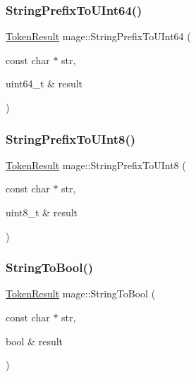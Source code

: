 \hypertarget{namespacemage_ae0ffd357b75c2e9321dcf44c00f1b607}{}\label{namespacemage_ae0ffd357b75c2e9321dcf44c00f1b607} 
\subsubsection{\texorpdfstring{String\+Prefix\+To\+U\+Int64()}{StringPrefixToUInt64()}}
{\footnotesize\ttfamily \hyperlink{namespacemage_a2178ba2411db5912f41b2e7698c2037d}{Token\+Result} mage\+::\+String\+Prefix\+To\+U\+Int64 (\begin{DoxyParamCaption}\item[{const char $\ast$}]{str,  }\item[{uint64\+\_\+t \&}]{result }\end{DoxyParamCaption})}

\hypertarget{namespacemage_ace3c30c1b0e1eddafc8f14335223c46b}{}\label{namespacemage_ace3c30c1b0e1eddafc8f14335223c46b} 
\subsubsection{\texorpdfstring{String\+Prefix\+To\+U\+Int8()}{StringPrefixToUInt8()}}
{\footnotesize\ttfamily \hyperlink{namespacemage_a2178ba2411db5912f41b2e7698c2037d}{Token\+Result} mage\+::\+String\+Prefix\+To\+U\+Int8 (\begin{DoxyParamCaption}\item[{const char $\ast$}]{str,  }\item[{uint8\+\_\+t \&}]{result }\end{DoxyParamCaption})}

\hypertarget{namespacemage_a4936774f925ba96c5b8d37c5e54cca02}{}\label{namespacemage_a4936774f925ba96c5b8d37c5e54cca02} 
\subsubsection{\texorpdfstring{String\+To\+Bool()}{StringToBool()}\hspace{0.1cm}{\footnotesize\ttfamily [1/2]}}
{\footnotesize\ttfamily \hyperlink{namespacemage_a2178ba2411db5912f41b2e7698c2037d}{Token\+Result} mage\+::\+String\+To\+Bool (\begin{DoxyParamCaption}\item[{const char $\ast$}]{str,  }\item[{bool \&}]{result }\end{DoxyParamCaption})}

